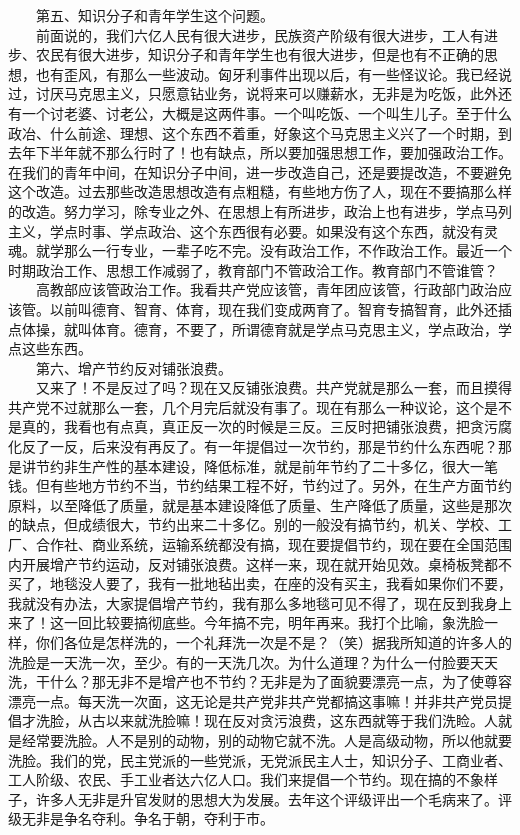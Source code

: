 \documentclass[cn,11pt,chinese]{elegantbook}
\begin{document}
　　第五、知识分子和青年学生这个问题。\\
　　前面说的，我们六亿人民有很大进步，民族资产阶级有很大进步，工人有进步、农民有很大进步，知识分子和青年学生也有很大进步，但是也有不正确的思想，也有歪风，有那么一些波动。匈牙利事件出现以后，有一些怪议论。我已经说过，讨厌马克思主义，只愿意钻业务，说将来可以赚薪水，无非是为吃饭，此外还有一个讨老婆、讨老公，大概是这两件事。一个叫吃饭、一个叫生儿子。至于什么政冶、什么前途、理想、这个东西不着重，好象这个马克思主义兴了一个时期，到去年下半年就不那么行时了！也有缺点，所以要加强思想工作，要加强政治工作。在我们的青年中间，在知识分子中间，进一步改造自己，还是要提改造，不要避免这个改造。过去那些改造思想改造有点粗糙，有些地方伤了人，现在不要搞那么样的改造。努力学习，除专业之外、在思想上有所进步，政治上也有进步，学点马列主义，学点时事、学点政治、这个东西很有必要。如果没有这个东西，就没有灵魂。就学那么一行专业，一辈子吃不完。没有政治工作，不作政治工作。最近一个时期政治工作、思想工作减弱了，教育部门不管政洽工作。教育部门不管谁管？\\
　　高教部应该管政治工作。我看共产党应该管，青年团应该管，行政部门政治应该管。以前叫德育、智育、体育，现在我们变成两育了。智育专搞智育，此外还插点体操，就叫体育。德育，不要了，所谓德育就是学点马克思主义，学点政治，学点这些东西。\\
　　第六、增产节约反对铺张浪费。\\
　　又来了！不是反过了吗？现在又反铺张浪费。共产党就是那么一套，而且摸得共产党不过就那么一套，几个月完后就没有事了。现在有那么一种议论，这个是不是真的，我看也有点真，真正反一次的时候是三反。三反时把铺张浪费，把贪污腐化反了一反，后来没有再反了。有一年提倡过一次节约，那是节约什么东西呢？那是讲节约非生产性的基本建设，降低标准，就是前年节约了二十多亿，很大一笔钱。但有些地方节约不当，节约结果工程不好，节约过了。另外，在生产方面节约原料，以至降低了质量，就是基本建设降低了质量、生产降低了质量，这些是那次的缺点，但成绩很大，节约出来二十多亿。别的一般没有搞节约，机关、学校、工厂、合作社、商业系统，运输系统都没有搞，现在要提倡节约，现在要在全国范围内开展增产节约运动，反对铺张浪费。这样一来，现在就开始见效。桌椅板凳都不买了，地毯没人要了，我有一批地毡出卖，在座的没有买主，我看如果你们不要，我就没有办法，大家提倡增产节约，我有那么多地毯可见不得了，现在反到我身上来了！这一回比较要搞彻底些。今年搞不完，明年再来。我打个比喻，象洗脸一样，你们各位是怎样洗的，一个礼拜洗一次是不是？（笑）据我所知道的许多人的洗脸是一天洗一次，至少。有的一天洗几次。为什么道理？为什么一付脸要天天洗，干什么？那无非不是增产也不节约？无非是为了面貌要漂亮一点，为了使尊容漂亮一点。每天洗一次面，这无论是共产党非共产党都搞这事嘛！并非共产党员提倡才洗脸，从古以来就洗脸嘛！现在反对贪污浪费，这东西就等于我们洗睑。人就是经常要洗脸。人不是别的动物，别的动物它就不洗。人是高级动物，所以他就要洗脸。我们的党，民主党派的一些党派，无党派民主人士，知识分子、工商业者、工人阶级、农民、手工业者达六亿人口。我们来提倡一个节约。现在搞的不象样子，许多人无非是升官发财的思想大为发展。去年这个评级评出一个毛病来了。评级无非是争名夺利。争名于朝，夺利于市。\\
\end{document}
